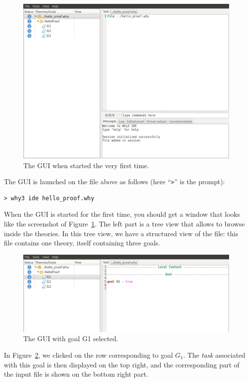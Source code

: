 \begin{figure}[tbp]
  \includegraphics[width=\textwidth]{gui-1.png}
  \caption{The GUI when started the very first time.}
  \label{fig:gui1}
\end{figure}

The GUI is launched on the file above as follows
(here ``\texttt{>}'' is the prompt):
\begin{verbatim}
> why3 ide hello_proof.why
\end{verbatim}
When the GUI is started for the first time, you should get a window
that looks like the screenshot of Figure~\ref{fig:gui1}.
The left part is a tree view that
allows to browse inside the theories.
In this tree view, we have a structured view of the file: this file
contains one theory, itself containing three goals.
\begin{figure}[tbp]
 \includegraphics[width=\textwidth]{gui-2.png}
  \caption{The GUI with goal G1 selected.}
  \label{fig:gui2}
\end{figure}
In Figure~\ref{fig:gui2}, we clicked on the row corresponding to
goal $G_1$. The \emph{task} associated with this goal is then
displayed on the top right, and the corresponding part of the input
file is shown on the bottom right part.


